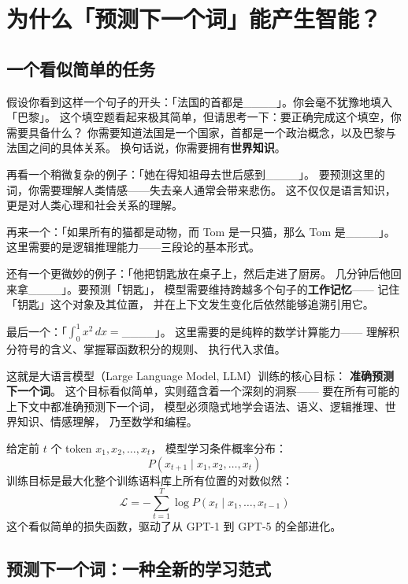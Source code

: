 \chapter{为什么「预测下一个词」能产生智能？}
\label{ch:intro}

\section{一个看似简单的任务}

假设你看到这样一个句子的开头：「法国的首都是\_\_\_\_」。你会毫不犹豫地填入「巴黎」。
这个填空题看起来极其简单，但请思考一下：要正确完成这个填空，你需要具备什么？
你需要知道法国是一个国家，首都是一个政治概念，以及巴黎与法国之间的具体关系。
换句话说，你需要拥有\textbf{世界知识}。

再看一个稍微复杂的例子：「她在得知祖母去世后感到\_\_\_\_」。
要预测这里的词，你需要理解人类情感——失去亲人通常会带来悲伤。
这不仅仅是语言知识，更是对人类心理和社会关系的理解。

再来一个：「如果所有的猫都是动物，而 Tom 是一只猫，那么 Tom 是\_\_\_\_」。
这里需要的是逻辑推理能力——三段论的基本形式。

还有一个更微妙的例子：「他把钥匙放在桌子上，然后走进了厨房。
几分钟后他回来拿\_\_\_\_」。要预测「钥匙」，
模型需要维持跨越多个句子的\textbf{工作记忆}——
记住「钥匙」这个对象及其位置，
并在上下文发生变化后依然能够追溯引用它。

最后一个：「$\int_0^1 x^2 \, dx = $\_\_\_\_」。
这里需要的是纯粹的数学计算能力——
理解积分符号的含义、掌握幂函数积分的规则、
执行代入求值。

这就是大语言模型（Large Language Model, LLM）训练的核心目标：
\textbf{准确预测下一个词}。
这个目标看似简单，实则蕴含着一个深刻的洞察——
要在所有可能的上下文中都准确预测下一个词，
模型必须隐式地学会语法、语义、逻辑推理、世界知识、情感理解，
乃至数学和编程。

\begin{corebox}[预测下一个词的数学形式]
给定前 $t$ 个 token $x_1, x_2, \ldots, x_t$，
模型学习条件概率分布：
\[
  P(x_{t+1} \mid x_1, x_2, \ldots, x_t)
\]
训练目标是最大化整个训练语料库上所有位置的对数似然：
\[
  \mathcal{L} = -\sum_{t=1}^{T} \log P(x_t \mid x_1, \ldots, x_{t-1})
\]
这个看似简单的损失函数，驱动了从 GPT-1 到 GPT-5 的全部进化。
\end{corebox}

\section{预测下一个词：一种全新的学习范式}


